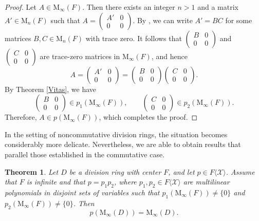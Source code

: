 \documentclass[11pt]{article}
\newtheorem{theorem}{Theorem}
\theoremstyle{definition}
\begin{document}
{{{{				\begin{proof}
					Let \( A \in \mathrm{M}_\infty(F) \). Then there exists an integer \( n > 1 \) and a matrix \( A' \in \mathrm{M}_n(F) \) such that
					$
					A =
					\begin{pmatrix}
						A' & 0 \\
						0 & 0
					\end{pmatrix}.
					$
					By \cite[Theorem 4.1]{Pa_Botha_97}, we can write \( A' = BC \) for some matrices \( B, C \in \mathrm{M}_n(F) \) with trace zero. It follows that
					$
					\begin{pmatrix}
						B & 0 \\
						0 & 0
					\end{pmatrix}
					$ and $
					\begin{pmatrix}
						C & 0 \\
						0 & 0
					\end{pmatrix}
					$
					are trace-zero matrices in \( \mathrm{M}_\infty(F) \), and hence
					\[
					A =
					\begin{pmatrix}
						A' & 0 \\
						0 & 0
					\end{pmatrix}
					=
					\begin{pmatrix}
						B & 0 \\
						0 & 0
					\end{pmatrix}
					\begin{pmatrix}
						C & 0 \\
						0 & 0
					\end{pmatrix}.
					\]
					By Theorem \ref{Vitas}, we have
					\[
					\begin{pmatrix}
						B & 0 \\
						0 & 0
					\end{pmatrix} \in p_1(\mathrm{M}_\infty(F)),
					\qquad
					\begin{pmatrix}
						C & 0 \\
						0 & 0
					\end{pmatrix} \in p_2(\mathrm{M}_\infty(F)).
					\]
					Therefore, \( A \in p(\mathrm{M}_\infty(F)) \), which completes the proof.
				\end{proof}
				
				In the setting of noncommutative division rings, the situation becomes considerably more delicate. Nevertheless, we are able to obtain results that parallel those established in the commutative case.
				
				\begin{theorem}\label{Vitas2}
					Let \( D \) be a division ring with center \( F \), and let \( p \in F\langle \mathcal{X} \rangle \). Assume that \( F \) is infinite and that \( p = p_1 p_2 \), where \( p_1, p_2 \in F\langle \mathcal{X} \rangle \) are multilinear polynomials in disjoint sets of variables such that \( p_1(\mathrm{M}_\infty(F)) \neq \{0\} \) and \( p_2(\mathrm{M}_\infty(F)) \neq \{0\} \). Then
					\[
					p(\mathrm{M}_\infty(D)) = \mathrm{M}_\infty(D).
					\]
				\end{theorem}
				
}}}}
\end{document}
